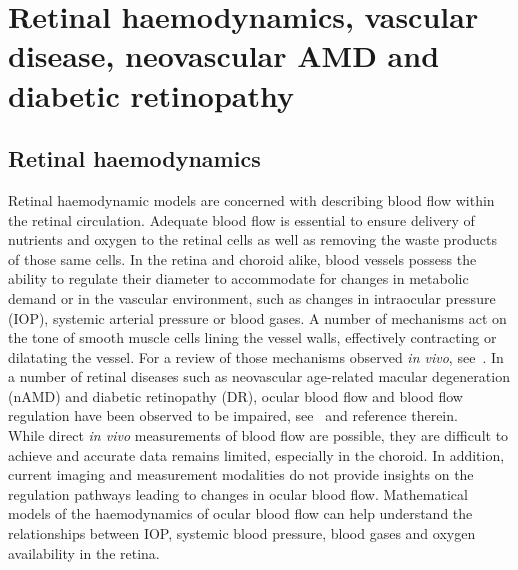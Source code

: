 \documentclass[12pt,a4paper]{article}
\begin{document}
\section{Retinal haemodynamics, vascular disease, neovascular AMD and diabetic retinopathy}

\subsection{Retinal haemodynamics}

Retinal haemodynamic models are concerned with describing blood flow within the retinal circulation.
Adequate blood flow is essential to ensure delivery of nutrients and oxygen to the retinal cells as well as removing the waste products of those same cells.
In the retina and choroid alike, blood vessels possess the ability to regulate their diameter to accommodate for changes in metabolic demand or in the vascular environment, such as changes in intraocular pressure (IOP), systemic arterial pressure or blood gases.
A number of mechanisms act on the tone of smooth muscle cells lining the vessel walls, effectively contracting or dilatating the vessel.
For a review of those mechanisms observed \textit{in vivo}, see~\cite{Kur_2012}.
In a number of retinal diseases such as neovascular age-related macular degeneration (nAMD) and diabetic retinopathy (DR), ocular blood flow and blood flow regulation have been observed to be impaired, see~\cite{Kur_2012} and reference therein.\\
While direct \textit{in vivo} measurements of blood flow are possible, they are difficult to achieve and accurate data remains limited, especially in the choroid.
In addition, current imaging and measurement modalities do not provide insights on the regulation pathways leading to changes in ocular blood flow.
Mathematical models of the haemodynamics of ocular blood flow can help understand the relationships between IOP, systemic blood pressure, blood gases and oxygen availability in the retina.
\end{document}
